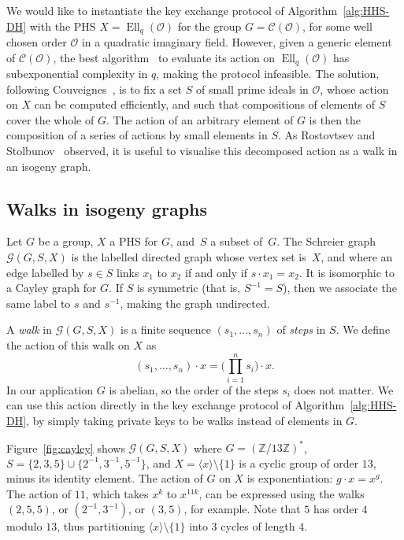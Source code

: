 \documentclass{llncs}
\newcommand{\Cl}{\mathcal{C}}
\newcommand{\Graph}{\mathcal{G}}
\renewcommand{\O}{\mathcal{O}}
\DeclareMathOperator{\Ell}{Ell}
\begin{document}
We would like to instantiate the key exchange protocol of
Algorithm~\ref{alg:HHS-DH} with the PHS
$X = \Ell_q(\O)$ for the group $G = \Cl(\O)$, 
for some well chosen order $\O$ in a quadratic imaginary field. 
However, given a generic element of $\Cl(\O)$, 
the best algorithm~\cite{jao+soukharev10} to evaluate
its action on $\Ell_q(\O)$ has subexponential complexity in $q$,
making the protocol infeasible. 
The solution,
following Couveignes~\cite{cryptoeprint:2006:291},
is to fix a set $S$ of small prime ideals in $\O$,
whose action on $X$ can be computed efficiently,
and such that compositions of elements of $S$
cover the whole of $G$.
The action of an arbitrary element of $G$
is then the composition of a series of actions by small elements in $S$.
As Rostovtsev and Stolbunov~\cite{rostovtsev+stolbunov06} observed,
it is useful to visualise this decomposed action
as a walk in an isogeny graph.


\subsection{Walks in isogeny graphs}

Let $G$ be a group,
$X$ a PHS for $G$,
and~$S$ a subset of~$G$.
The Schreier graph $\Graph(G,S,X)$
is the labelled directed graph whose vertex set is~$X$, 
and where an edge labelled by $s∈S$
links $x_1$ to $x_2$ if and only if $s\cdot x_1 = x_2$.
It is isomorphic to a Cayley graph for $G$.
If $S$ is symmetric (that is, $S^{-1}=S$), 
then we associate the same label to $s$ and $s^{-1}$, 
making the graph undirected.

A \emph{walk} in $\Graph(G,S,X)$ is a finite sequence
$(s_1,\ldots,s_n)$ of \emph{steps} in $S$. 
We define the action of this walk on $X$ as
\[
    (s_1,\ldots,s_n)·x 
    = 
    \big(\prod_{i=1}^n s_i\big)·x.
\]
In our application $G$ is abelian,
so the order of the steps $s_i$ does not matter.
We can use this action directly in the key exchange protocol
of Algorithm~\ref{alg:HHS-DH},
by simply taking private keys to be walks instead of elements in $G$.

\begin{example}
Figure~\ref{fig:cayley}
shows $\Graph(G,S,X)$ where $G=(ℤ/13ℤ)^*$, 
$S = \{2,3,5\}\cup\{2^{-1},3^{-1},5^{-1}\}$,
and $X = \langle{x}\rangle\setminus\{1\}$ 
is a cyclic group of order $13$, minus its identity element.
The action of $G$ on $X$ is exponentiation: $g·x=x^g$.
The action of $11$, which takes $x^k$ to $x^{11k}$,
can be expressed using the walks 
$(2,5,5)$,
or $(2^{-1},3^{-1})$,
or $(3,5)$,
for example.  Note that $5$ has order $4$ modulo
$13$, thus partitioning $〈x〉\setminus\{1\}$ into $3$ cycles of
length $4$.
\end{example}
\end{document}
